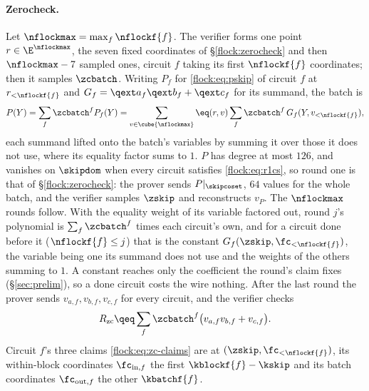 \paragraph{Zerocheck.} Let $\nflockmax=\max_f\nflockf{f}$. The verifier forms one point $r\in\E^{\nflockmax}$, the seven fixed coordinates of \S\ref{flock:zerocheck} and then $\nflockmax-7$ sampled ones, circuit $f$ taking its first $\nflockf{f}$ coordinates; then it samples $\zcbatch$. Writing $P_f$ for \eqref{flock:eq:pskip} of circuit $f$ at $r_{<\nflockf{f}}$ and $G_f=\qext a_f\qext b_f+\qext c_f$ for its summand, the batch is
\[
P(Y)=\sum_f\zcbatch^{f}P_f(Y)=\sum_{v\in\cube{\nflockmax}}\eq(r,v)\sum_f\zcbatch^{f}\,G_f(Y,v_{<\nflockf{f}}),
\]
each summand lifted onto the batch's variables by summing it over those it does not use, where its equality factor sums to $1$. $P$ has degree at most $126$, and vanishes on $\skipdom$ when every circuit satisfies \eqref{flock:eq:r1cs}, so round one is that of \S\ref{flock:zerocheck}: the prover sends $P|_{\skipcoset}$, $64$ values for the whole batch, and the verifier samples $\zskip$ and reconstructs $v_P$. The $\nflockmax$ rounds follow. With the equality weight of its variable factored out, round $j$'s polynomial is $\sum_f\zcbatch^f$ times each circuit's own, and for a circuit done before it ($\nflockf{f}\le j$) that is the constant $G_f(\zskip,\fc_{<\nflockf{f}})$, the variable being one its summand does not use and the weights of the others summing to $1$. A constant reaches only the coefficient the round's claim fixes (\S\ref{sec:prelim}), so a done circuit costs the wire nothing. After the last round the prover sends $v_{a,f},v_{b,f},v_{c,f}$ for every circuit, and the verifier checks
\begin{equation}\label{flock:eq:batch-zc-terminal}
R_{\mathrm{zc}}\qeq\sum_f\zcbatch^{f}\bigl(v_{a,f}v_{b,f}+v_{c,f}\bigr).
\end{equation}
Circuit $f$'s three claims \eqref{flock:eq:zc-claims} are at $(\zskip,\fc_{<\nflockf{f}})$, its within-block coordinates $\fc_{\mathrm{in},f}$ the first $\kblockf{f}-\kskip$ and its batch coordinates $\fc_{\mathrm{out},f}$ the other $\kbatchf{f}$.

